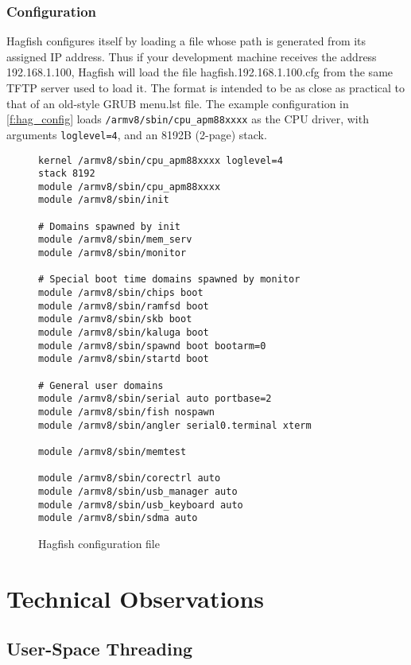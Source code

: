 \documentclass[a4paper,twoside]{report}
\begin{document}
\subsection{Configuration}

Hagfish configures itself by loading a file whose path is generated from its
assigned IP address. Thus if your development machine receives the address
192.168.1.100, Hagfish will load the file hagfish.192.168.1.100.cfg from the
same TFTP server used to load it. The format is intended to be as close as
practical to that of an old-style GRUB menu.lst file. The example
configuration in \autoref{f:hag_config} loads
\texttt{/armv8/sbin/cpu\_apm88xxxx} as the CPU driver, with arguments
\texttt{loglevel=4}, and an 8192B (2-page) stack.

\begin{figure}
\begin{center}
\begin{lstlisting}
kernel /armv8/sbin/cpu_apm88xxxx loglevel=4
stack 8192
module /armv8/sbin/cpu_apm88xxxx
module /armv8/sbin/init

# Domains spawned by init
module /armv8/sbin/mem_serv
module /armv8/sbin/monitor

# Special boot time domains spawned by monitor
module /armv8/sbin/chips boot
module /armv8/sbin/ramfsd boot
module /armv8/sbin/skb boot
module /armv8/sbin/kaluga boot
module /armv8/sbin/spawnd boot bootarm=0
module /armv8/sbin/startd boot

# General user domains
module /armv8/sbin/serial auto portbase=2
module /armv8/sbin/fish nospawn
module /armv8/sbin/angler serial0.terminal xterm

module /armv8/sbin/memtest

module /armv8/sbin/corectrl auto
module /armv8/sbin/usb_manager auto
module /armv8/sbin/usb_keyboard auto
module /armv8/sbin/sdma auto
\end{lstlisting}
\end{center}
\caption{Hagfish configuration file}
\label{f:hag_config}
\end{figure}

\chapter{Technical Observations}\label{c:tech}

\section{User-Space Threading}\label{s:threads}
\end{document}
